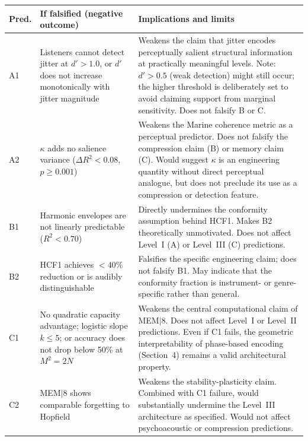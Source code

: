 \documentclass[11pt, a4paper]{article}
\newcommand{\mem}{MEM$|$8}
\newcommand{\hcf}{HCF1}
\begin{document}
\noindent\begin{minipage}{\textwidth}
\centering
\renewcommand{\arraystretch}{1.5}
\begin{tabular}{p{1.1cm} p{4.2cm} p{5.8cm}}
\toprule
\textbf{Pred.} & \textbf{If falsified (negative outcome)} & \textbf{Implications and limits} \\
\midrule
A1 &
  Listeners cannot detect jitter at $d' > 1.0$, or $d'$ does not increase
  monotonically with jitter magnitude &
  Weakens the claim that jitter encodes perceptually salient structural
  information at practically meaningful levels.  Note: $d' > 0.5$ (weak
  detection) might still occur; the higher threshold is deliberately set to
  avoid claiming support from marginal sensitivity.  Does not falsify B or C. \\
A2 &
  $\kappa$ adds no salience variance ($\Delta R^2 < 0.08$, $p \geq 0.001$) &
  Weakens the Marine coherence metric as a perceptual predictor.  Does not
  falsify the compression claim (B) or memory claim (C).  Would suggest
  $\kappa$ is an engineering quantity without direct perceptual analogue,
  but does not preclude its use as a compression or detection feature. \\
B1 &
  Harmonic envelopes are not linearly predictable ($R^2 < 0.70$) &
  Directly undermines the conformity assumption behind \hcf{}.  Makes B2
  theoretically unmotivated.  Does not affect Level~I (A) or Level~III (C)
  predictions. \\
B2 &
  \hcf{} achieves $< 40\%$ reduction or is audibly distinguishable &
  Falsifies the specific engineering claim; does not falsify B1.  May indicate
  that the conformity fraction is instrument- or genre-specific rather than
  general. \\
C1 &
  No quadratic capacity advantage; logistic slope $k \leq 5$; or accuracy does
  not drop below 50\% at $M^2 = 2N$ &
  Weakens the central computational claim of \mem{}.  Does not affect Level~I
  or Level~II predictions.  Even if C1 fails, the geometric interpretability
  of phase-based encoding (Section~4) remains a valid architectural property. \\
C2 &
  \mem{} shows comparable forgetting to Hopfield &
  Weakens the stability-plasticity claim.  Combined with C1 failure, would
  substantially undermine the Level~III architecture as specified.  Would not
  affect psychoacoustic or compression predictions. \\
\bottomrule
\end{tabular}
\end{minipage}
\end{document}
